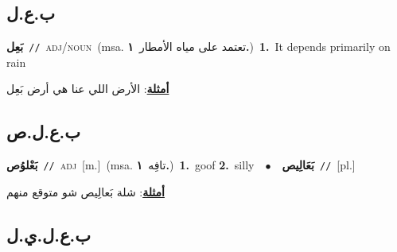 \documentclass[10pt,a4paper,twoside]{article} %
\begin{document}
\begin{multicols}{2}
\vspace{-3mm}
\subsection*{\color{blue}\foreignlanguage{arabic}{ب.ع.ل}\color{blue}{}} 

{\setlength\topsep{0pt}\textbf{\foreignlanguage{arabic}{بَعِل}}\ {\color{gray}\texttt{//}\color{black}}\ \textsc{adj/noun}\ \color{gray}(msa. \foreignlanguage{arabic}{تعتمد على مياه الأمطار}~\foreignlanguage{arabic}{\textbf{١.}})\color{black}\ \textbf{1.}~It depends primarily on rain\  \begin{flushright}\color{gray}\foreignlanguage{arabic}{\textbf{\underline{\foreignlanguage{arabic}{أمثلة}}}: الأرض اللي عنا هي أرض بَعِل}\end{flushright}\color{black}} \vspace{2mm}

\vspace{-3mm}
\subsection*{\color{blue}\foreignlanguage{arabic}{ب.ع.ل.ص}\color{blue}{}} 

{\setlength\topsep{0pt}\textbf{\foreignlanguage{arabic}{بَعْلوُص}}\ {\color{gray}\texttt{//}\color{black}}\ \textsc{adj}\ [m.]\ \color{gray}(msa. \foreignlanguage{arabic}{تافِه}~\foreignlanguage{arabic}{\textbf{١.}})\color{black}\ \textbf{1.}~goof  \textbf{2.}~silly\ \ $\bullet$\ \ \setlength\topsep{0pt}\textbf{\foreignlanguage{arabic}{بَعَالِيص}}\ {\color{gray}\texttt{//}\color{black}}\ [pl.]\  \begin{flushright}\color{gray}\foreignlanguage{arabic}{\textbf{\underline{\foreignlanguage{arabic}{أمثلة}}}: شلة بَعالِيص شو متوقع منهم}\end{flushright}\color{black}} \vspace{2mm}

\vspace{-3mm}
\subsection*{\color{blue}\foreignlanguage{arabic}{ب.ع.ل.ي.ل}\color{blue}{ (ntws)}} 


\end{multicols}
\end{document}
